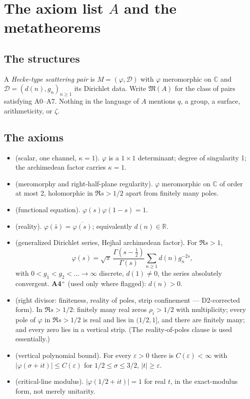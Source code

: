 \documentclass[11pt]{amsart}
\theoremstyle{remark}
\begin{document}
\section{The axiom list $A$ and the metatheorems}
\label{sec:metatheorems}

\subsection{The structures}

A \emph{Hecke-type scattering pair} is $M=(\varphi,\mathcal D)$ with
$\varphi$ meromorphic on $\mathbb C$ and
$\mathcal D=(d(n),g_n)_{n\ge1}$ its Dirichlet data. Write
$\mathfrak M(A)$ for the class of pairs satisfying A0--A7. Nothing in the
language of $A$ mentions $q$, a group, a surface, arithmeticity, or
$\zeta$.

\subsection{The axioms}

\begin{itemize}
\item[\textbf{A0}] (scalar, one channel, $\kappa=1$). $\varphi$ is a
$1\times1$ determinant; degree of singularity 1; the archimedean factor
carries $\kappa=1$.
\item[\textbf{A1}] (meromorphy and right-half-plane regularity).
$\varphi$ meromorphic on $\mathbb C$ of order at most 2, holomorphic in
$\Re s>1/2$ apart from finitely many poles.
\item[\textbf{A2}] (functional equation). $\varphi(s)\varphi(1-s)=1$.
\item[\textbf{A3}] (reality). $\varphi(\bar s)=\overline{\varphi(s)}$;
equivalently $d(n)\in\mathbb R$.
\item[\textbf{A4}] (generalized Dirichlet series, Hejhal archimedean
factor). For $\Re s>1$,
\[
\varphi(s)=\sqrt\pi\,\frac{\Gamma(s-\tfrac12)}{\Gamma(s)}\sum_{n\ge1}d(n)g_n^{-2s},
\]
with $0<g_1<g_2<\dots\to\infty$ discrete, $d(1)\neq0$, the series
absolutely convergent. \textbf{A4$^+$} (used only where flagged):
$d(n)>0$.
\item[\textbf{A5}] (right divisor: finiteness, reality of poles, strip
confinement --- D2-corrected form). In $\Re s>1/2$: finitely many real
zeros $\rho_i>1/2$ with multiplicity; every pole of $\varphi$ in
$\Re s>1/2$ is real and lies in $(1/2,1]$, and there are finitely many;
and every zero lies in a vertical strip. (The reality-of-poles clause is
used essentially.)
\item[\textbf{A6}] (vertical polynomial bound). For every $\varepsilon>0$
there is $C(\varepsilon)<\infty$ with
$|\varphi(\sigma+it)|\le C(\varepsilon)$ for $1/2\le\sigma\le3/2$,
$|t|\ge\varepsilon$.
\item[\textbf{A7}] (critical-line modulus). $|\varphi(1/2+it)|=1$ for
real $t$, in the exact-modulus form, not merely unitarity.
\end{itemize}
\end{document}
